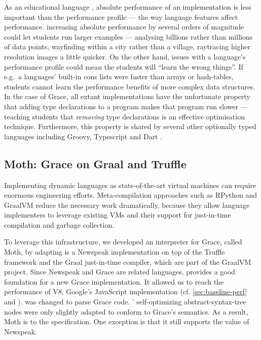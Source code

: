 As an educational language \cite{panel}, absolute performance of an
implementation is less important than the performance profile --- the
way language features affect performance.  increasing absolute
performance by several orders of magnitude could let students run
larger examples --- analysing billions rather than millions of data
points, wayfinding within a city rather than a village, raytracing
higher resolution images a little quicker.  On the other hand, issues
with a language's performance profile could mean the students will
``learn the wrong things''.  If e.g.\ a languages' built-in cons lists
were faster than arrays or hash-tables, students cannot learn the
performance benefits of more complex data structures. In the case of
Grace, all extant implementations have the unfortunate property that
adding type declarations to a program makes that program run slower
--- teaching students that \emph{removing} type declarations is an
effective optimisation technique.  Furthermore, this property is shared
by several other optionally typed languages including Groovy,
Typescript and Dart \cite{find-who-says-this-and-cite-them}.




\subsection{Moth: Grace on Graal and Truffle}
\label{ssec:moth}

Implementing dynamic languages as state-of-the-art virtual machines
can require enormous engineering efforts.
Meta-compilation approaches\citep{Marr:2015:MTPE}
such as RPython\citep{Bolz:2009:TMP,Bolz:2013:IMT}
and GraalVM\citep{Wurthinger2013,Wurthinger:2017:PPE}
reduce the necessary work dramatically,
because they allow language implementers to leverage existing VMs
and their support for just-in-time compilation and garbage collection.

To leverage this infrastructure, we developed an interpreter for Grace,
called Moth\citep{Roberts2017}, by adapting
\SOMns is a Newspeak implementation\citep{Bracha:10:NS} on top of the Truffle framework and the Graal just-in-time compiler,
which are part of the GraalVM project.
Since Newspeak and Grace are related languages,
\SOMns provides a good foundation for a new Grace implementation.
It allowed us to reach the performance of V8,
Google's JavaScript implementation
(cf. \cref{sec:baseline-perf} and \citet{Marr2016}).
\SOMns was changed to parse Grace code.
\SOMns' self-optimizing abstract-syntax-tree nodes were only slightly adapted to conform to Grace's semantics.
As a result, Moth is  to the specification.
One exception is that it still supports the  value of Newspeak.


